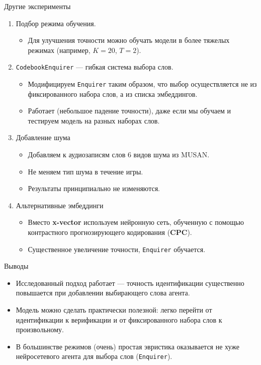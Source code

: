 \documentclass[aspectratio=43]{beamer}
\newcommand{\enquirer}{\texttt{Enquirer}}
\begin{document}
\begin{frame}{Другие эксперименты}
    \begin{enumerate}
        \item Подбор режима обучения.
        \begin{itemize}
            \item Для улучшения точности можно обучать модели в более тяжелых
            режимах (например, $K = 20$, $T = 2$).
        \end{itemize}
        \item \texttt{CodebookEnquirer} --- гибкая система выбора слов.
        \begin{itemize}
            \item Модифицируем \enquirer{} таким образом, что выбор осуществляется
            не из фиксированного набора слов, а из списка эмбеддингов.
            \item Работает (небольшое падение точности), даже если мы обучаем
            и тестируем модель на разных наборах слов.
        \end{itemize}

        \item Добавление шума
        \begin{itemize}
            \item Добавляем к аудиозаписям слов 6 видов шума из MUSAN\@.
            \item Не меняем тип шума в течение игры.
            \item Результаты принципиально не изменяются.
        \end{itemize}

        \item Альтернативные эмбеддинги
        \begin{itemize}
            \item Вместо \textbf{x-vector} используем нейронную сеть, обученную
            с помощью контрастного прогнозирующего кодирования (\textbf{CPC}).
            \item Существенное увеличение точности, \enquirer{} обучается.
        \end{itemize}
    \end{enumerate}
\end{frame}

\begin{frame}{Выводы}
    \begin{itemize}
        \item Исследованный подход работает --- точность идентификации 
        существенно повышается при добавлении выбирающего слова
        агента.
        \item Модель можно сделать практически полезной: легко перейти от
        идентификации к верификации и от фиксированного набора слов к
        произвольному.
        \item В большинстве режимов (очень) простая эвристика оказывается не хуже
        нейросетевого агента для выбора слов (\enquirer{}).
    \end{itemize}
\end{frame}
\end{document}
